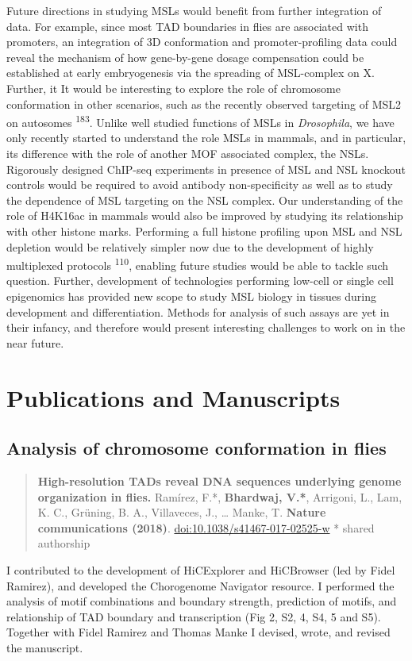 \documentclass[11pt,twoside]{MPIthesis}
\theoremstyle{definition}
\theoremstyle{definition}
\theoremstyle{definition}
\theoremstyle{remark}
\begin{document}
Future directions in studying MSLs would benefit from further
integration of data. For example, since most TAD boundaries in flies are
associated with promoters, an integration of 3D conformation and
promoter-profiling data could reveal the mechanism of how gene-by-gene
dosage compensation could be established at early embryogenesis via the
spreading of MSL-complex on X. Further, it It would be interesting to
explore the role of chromosome conformation in other scenarios, such as
the recently observed targeting of MSL2 on autosomes
\textsuperscript{183}. Unlike well studied functions of MSLs in
\emph{Drosophila}, we have only recently started to understand the role
MSLs in mammals, and in particular, its difference with the role of
another MOF associated complex, the NSLs. Rigorously designed ChIP-seq
experiments in presence of MSL and NSL knockout controls would be
required to avoid antibody non-specificity as well as to study the
dependence of MSL targeting on the NSL complex. Our understanding of the
role of H4K16ac in mammals would also be improved by studying its
relationship with other histone marks. Performing a full histone
profiling upon MSL and NSL depletion would be relatively simpler now due
to the development of highly multiplexed protocols
\textsuperscript{110}, enabling future studies would be able to tackle
such question. Further, development of technologies performing low-cell
or single cell epigenomics has provided new scope to study MSL biology
in tissues during development and differentiation. Methods for analysis
of such assays are yet in their infancy, and therefore would present
interesting challenges to work on in the near future.

\appendix

\chapter{Publications and
Manuscripts}\label{publications-and-manuscripts}

\section{Analysis of chromosome conformation in
flies}\label{analysis-of-chromosome-conformation-in-flies}
\begin{quote}
\textbf{High-resolution TADs reveal DNA sequences underlying genome
organization in flies.} Ramírez, F.*, \textbf{Bhardwaj, V.*}, Arrigoni,
L., Lam, K. C., Grüning, B. A., Villaveces, J., \ldots{} Manke, T.
\textbf{Nature communications (2018)}.
\url{doi:10.1038/s41467-017-02525-w} * shared authorship
\end{quote}
I contributed to the development of HiCExplorer and HiCBrowser (led by
Fidel Ramirez), and developed the Chorogenome Navigator resource. I
performed the analysis of motif combinations and boundary strength,
prediction of motifs, and relationship of TAD boundary and transcription
(Fig 2, S2, 4, S4, 5 and S5). Together with Fidel Ramirez and Thomas
Manke I devised, wrote, and revised the manuscript.
\end{document}
